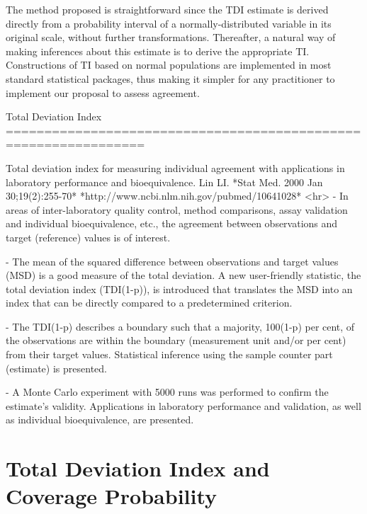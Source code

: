 \documentclass[MAIN.tex]{subfiles}
\begin{document}
The method proposed is straightforward since the TDI estimate is derived directly from a probability interval of a normally-distributed variable in its original scale, without further transformations. Thereafter, a natural way of making inferences about this estimate is to derive the appropriate TI. Constructions of TI based on normal populations are implemented in most standard statistical packages, thus making it simpler for any practitioner to implement our proposal to assess agreement.
\newpage
	
Total Deviation Index
================================================================

Total deviation index for measuring individual agreement with applications in laboratory performance and bioequivalence.
Lin LI.
*Stat Med. 2000 Jan 30;19(2):255-70*
*http://www.ncbi.nlm.nih.gov/pubmed/10641028*
<hr>
- In areas of inter-laboratory quality control, method comparisons, assay validation and individual bioequivalence, etc., 
the agreement between observations and target (reference) values is of interest. 

- The mean of the squared difference between observations and target values (MSD) is a good measure of the total deviation. 
A new user-friendly statistic, the total deviation index (TDI(1-p)), is introduced that translates the MSD into an index
that can be directly compared to a predetermined criterion. 

- The TDI(1-p) describes a boundary such that a majority, 100(1-p) per cent, of the observations are within the boundary
(measurement unit and/or per cent) from their target values. Statistical inference using the sample counter part
(estimate) is presented. 

- A Monte Carlo experiment with 5000 runs was performed to confirm the estimate's validity.
Applications in laboratory performance and validation, as well as individual bioequivalence, are presented.
	
	\section{Total Deviation Index and Coverage Probability}
	
	
\end{document}
